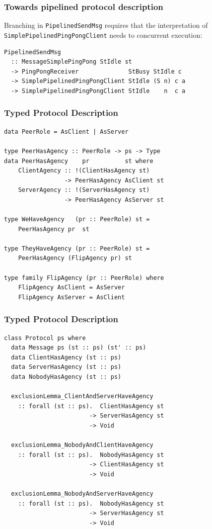 \documentclass[t,dvipsnames]{beamer}
\begin{document}
\begin{frame}[fragile]
  \frametitle{Towards pipelined protocol description}
  \vspace{2cm}
  Branching in \texttt{PipelinedSendMsg} requires that the interpretation of
  \texttt{SimplePipelinedPingPongClient} needs to concurrent execution: 
    \begin{verbatim}
PipelinedSendMsg
  :: MessageSimplePingPong StIdle st
  -> PingPongReceiver              StBusy StIdle c
  -> SimplePipelinedPingPongClient StIdle (S n) c a
  -> SimplePipelinedPingPongClient StIdle    n  c a
    \end{verbatim}
\end{frame}

\begin{frame}[fragile]
  \frametitle{Typed Protocol Description}
  \begin{verbatim}
data PeerRole = AsClient | AsServer

type PeerHasAgency :: PeerRole -> ps -> Type
data PeerHasAgency    pr          st where
    ClientAgency :: !(ClientHasAgency st)
                 -> PeerHasAgency AsClient st
    ServerAgency :: !(ServerHasAgency st)
                 -> PeerHasAgency AsServer st

type WeHaveAgency   (pr :: PeerRole) st =
    PeerHasAgency pr  st

type TheyHaveAgency (pr :: PeerRole) st =
    PeerHasAgency (FlipAgency pr) st

type family FlipAgency (pr :: PeerRole) where
    FlipAgency AsClient = AsServer
    FlipAgency AsServer = AsClient
  \end{verbatim}
\end{frame}

\begin{frame}[fragile]
  \frametitle{Typed Protocol Description}
  \begin{verbatim}
class Protocol ps where
  data Message ps (st :: ps) (st' :: ps)
  data ClientHasAgency (st :: ps)
  data ServerHasAgency (st :: ps)
  data NobodyHasAgency (st :: ps)

  exclusionLemma_ClientAndServerHaveAgency
    :: forall (st :: ps).  ClientHasAgency st
                        -> ServerHasAgency st
                        -> Void

  exclusionLemma_NobodyAndClientHaveAgency
    :: forall (st :: ps).  NobodyHasAgency st
                        -> ClientHasAgency st
                        -> Void

  exclusionLemma_NobodyAndServerHaveAgency
    :: forall (st :: ps).  NobodyHasAgency st
                        -> ServerHasAgency st
                        -> Void
  \end{verbatim}
\end{frame}
\end{document}
